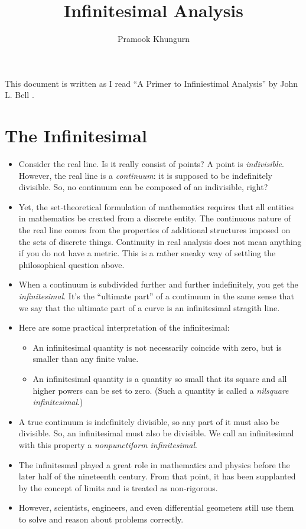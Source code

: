 \documentclass[10pt]{article}
\title{Infinitesimal Analysis}
\author{Pramook Khungurn}
\begin{document}
	\maketitle

  This document is written as I read ``A Primer to Infiniestimal Analysis'' by John L. Bell \cite{Bell}.

  \section{The Infinitesimal} %
  \label{sec:the_infinitesimal}

  \begin{itemize}
  	\item Consider the real line. Is it really consist of points? A point is \emph{indivisible}. However, the real line is a \emph{continuum}: it is supposed to be indefinitely divisible. So, no continuum can be composed of an indivisible, right?

  	\item Yet, the set-theoretical formulation of mathematics requires that all entities in mathematics be created from a discrete entity. The continuous nature of the real line comes from the properties of additional structures imposed on the sets of discrete things. Continuity in real analysis does not mean anything if you do not have a metric. This is a rather sneaky way of settling the philosophical question above.

  	\item When a continuum is subdivided further and further indefinitely, you get the \emph{infinitesimal}. It's the ``ultimate part'' of a continuum in the same sense that we say that the ultimate part of a curve is an infinitesimal stragith line.

  	\item Here are some practical interpretation of the infinitesimal:
  		\begin{itemize}
  			\item An infinitesimal quantity is not necessarily coincide with zero, but is smaller than any finite value.

  			\item An infinitesimal quantity is a quantity so small that its square and all higher powers can be set to zero. (Such a quantity is called a \emph{nilsquare infinitesimal}.)
  		\end{itemize}

  	\item A true continuum is indefinitely divisible, so any part of it must also be divisible. So, an infinitesimal must also be divisible. We call an infinitesimal with this property a \emph{nonpunctiform infinitesimal}.

  	\item The infinitesmal played a great role in mathematics and physics before the later half of the nineteenth century. From that point, it has been supplanted by the concept of limits and is treated as non-rigorous.

  	\item However, scientists, engineers, and even differential geometers still use them to solve and reason about problems correctly.
  \end{itemize}
\end{document}

